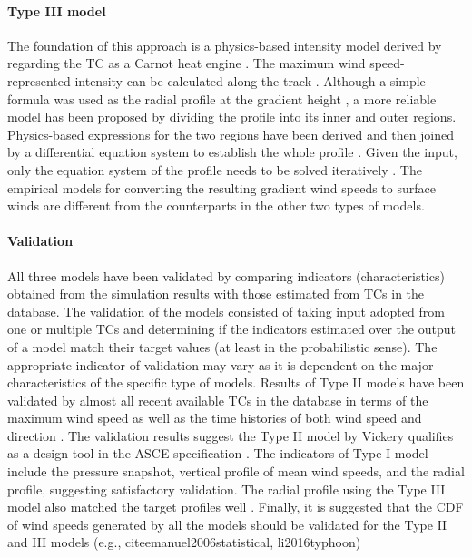\paragraph{Type III model} The foundation of this approach is a physics-based intensity model derived by regarding the TC as a Carnot heat engine \citep{emanuel2004tropical, emanuel1988maximum}. The maximum wind speed-represented intensity can be calculated along the track \citep{emanuel2011selfstratification}. Although a simple formula was used as the radial profile at the gradient height \citep{emanuel2006statistical, lin2012hurricane}, a more reliable model has been proposed by dividing the profile into its inner and outer regions. Physics-based expressions for the two regions have been derived and then joined by a differential equation system to establish the whole profile \citep{emanuel2004tropical, emanuel2011selfstratificationa}. Given the input, only the equation system of the profile needs to be solved iteratively \citep{chavas2016model, chavas2015model}. The empirical models for converting the resulting gradient wind speeds to surface winds are different from the counterparts in the other two types of models. 

\paragraph{Validation} All three models have been validated by comparing indicators (characteristics) obtained from the simulation results with those estimated from TCs in the database. The validation of the models consisted of taking input adopted from one or multiple TCs and determining if the indicators estimated over the output of a model match their target values (at least in the probabilistic sense). The appropriate indicator of validation may vary as it is dependent on the major characteristics of the specific type of models. Results of Type II models have been validated by almost all recent available TCs in the database in terms of the maximum wind speed as well as the time histories of both wind speed and direction \citep{li2016typhoona, vickery2000hurricane, vickery2009hurricane-b}. The validation results suggest the Type II model by Vickery qualifies as a design tool in the ASCE specification \citep{vickery2009hurricane-c}. The indicators of Type I model include the pressure snapshot, vertical profile of mean wind speeds, and the radial profile, suggesting satisfactory validation. The radial profile using the Type III model also matched the target profiles well \citep{chavas2015model, emanuel2004tropical, emanuel2006statistical}. Finally, it is suggested that the CDF of wind speeds generated by all the models should be validated for the Type II and III models (e.g., cite{emanuel2006statistical, li2016typhoon}) 

